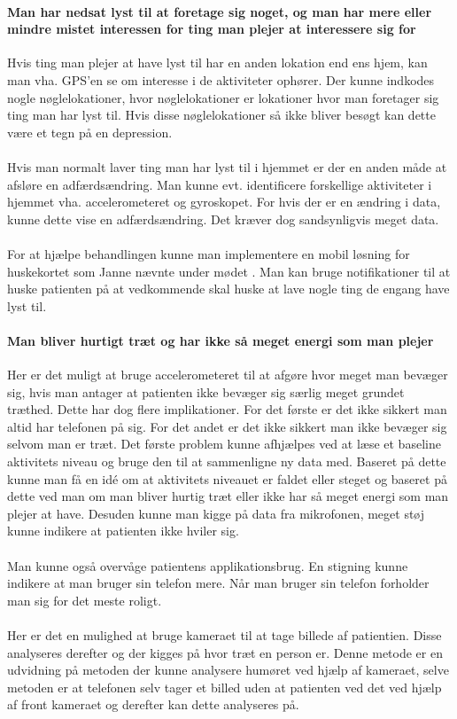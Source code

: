 \paragraph{Man har nedsat lyst til at foretage sig noget, og man har mere eller mindre mistet interessen for ting man plejer at interessere sig for}
Hvis ting man plejer at have lyst til har en anden lokation end ens hjem, kan man vha. GPS'en se om interesse i de aktiviteter ophører. Der kunne indkodes nogle nøglelokationer, hvor nøglelokationer er lokationer hvor man foretager sig ting man har lyst til.
Hvis disse nøglelokationer så ikke bliver besøgt kan dette være et tegn på en depression.
\\
\\
Hvis man normalt laver ting man har lyst til i hjemmet er der en anden måde at afsløre en adfærdsændring. Man kunne evt. identificere forskellige aktiviteter i hjemmet vha. accelerometeret og gyroskopet. For hvis der er en ændring i data, kunne dette vise en adfærdsændring. Det kræver dog sandsynligvis meget data.
\\
\\
For at hjælpe behandlingen kunne man implementere en mobil løsning for huskekortet som Janne nævnte under mødet \citep{misc:janne-rasmussen}. Man kan bruge notifikationer til at huske patienten på at vedkommende skal huske at lave nogle ting de engang have lyst til.

\paragraph{Man bliver hurtigt træt og har ikke så meget energi som man plejer}
Her er det muligt at bruge accelerometeret til at afgøre hvor meget man bevæger sig, hvis man antager at patienten ikke bevæger sig særlig meget grundet træthed. Dette har dog flere implikationer. For det første er det ikke sikkert man altid har telefonen på sig. For det andet er det ikke sikkert man ikke bevæger sig selvom man er træt.
Det første problem kunne afhjælpes ved at læse et baseline aktivitets niveau og bruge den til at sammenligne ny data med. Baseret på dette kunne man få en idé om at aktivitets niveauet er faldet eller steget og baseret på dette ved man om man bliver hurtig træt eller ikke har så meget energi som man plejer at have. 
Desuden kunne man kigge på data fra mikrofonen, meget støj kunne indikere at patienten ikke hviler sig.
\\
\\
Man kunne også overvåge patientens applikationsbrug. 
En stigning kunne indikere at man bruger sin telefon mere. 
Når man bruger sin telefon forholder man sig for det meste roligt.
\\
\\
Her er det en mulighed at bruge kameraet til at tage billede af patientien. Disse analyseres derefter og der kigges på hvor træt en person er. 
Denne metode er en udvidning på metoden der kunne analysere humøret ved hjælp af kameraet, selve metoden er at telefonen selv tager et billed uden at patienten ved det ved hjælp af front kameraet og derefter kan dette analyseres på.

